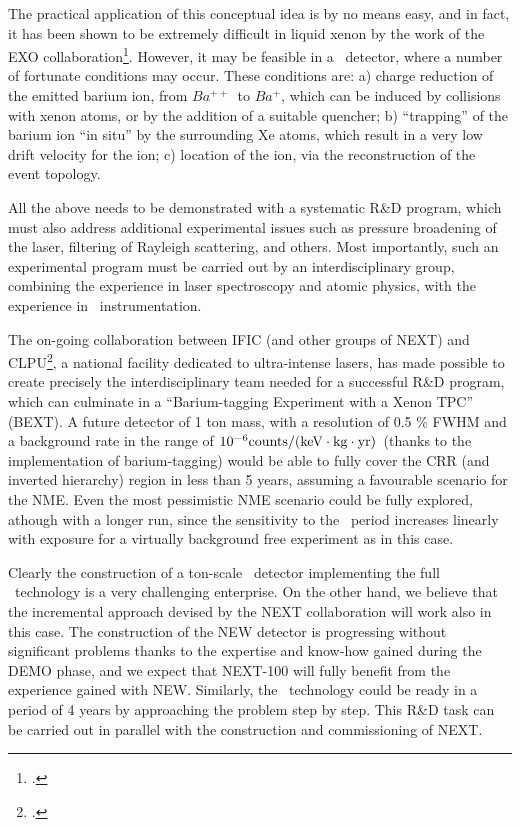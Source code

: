 The practical application of this conceptual idea is by no means easy, and in fact, it has been shown to be extremely difficult in liquid xenon by the work of the EXO collaboration\footcite{Dolinski:2012dta}. However, it may be feasible in a \HPXE\ detector, where a number of fortunate conditions may occur. These conditions are: a) charge reduction of the emitted barium ion, from $Ba^{++}$~to $Ba^{+}$, which can be induced by collisions with xenon atoms, or by the addition of a suitable quencher; b) ``trapping'' of the barium ion ``in situ'' by the surrounding Xe atoms, which result in a very low drift velocity for the ion; c) location of the ion, via the reconstruction of the event topology. 

All the above needs to be demonstrated with a systematic R\&D program, which must also address additional experimental issues such as pressure broadening of the laser, filtering of Rayleigh scattering, and others. Most importantly, such an experimental program must be carried out by an interdisciplinary group, combining the experience in laser spectroscopy and atomic physics, with the experience in \HPXE\ instrumentation.

The on-going collaboration between IFIC (and other groups of NEXT) and CLPU\footcite{clpu}, a national facility dedicated to ultra-intense lasers, has made possible to create precisely the interdisciplinary team needed for a successful R\&D program, which can culminate in a ``Barium-tagging Experiment with a Xenon TPC'' (BEXT). 
A future detector of 1 ton mass, with a resolution of 0.5 \% FWHM and a background rate in the range of $10^{-6} \rm counts/(keV \cdot kg \cdot yr)$~(thanks to the implementation of barium-tagging) would be able to fully cover the CRR (and inverted hierarchy) region in less than 5 years, assuming a favourable scenario for the NME. Even the most pessimistic NME scenario could be fully explored, athough with a longer run, since the sensitivity to the \bbonu\ period increases linearly with exposure for a virtually background free experiment as in this case. 

Clearly the construction of a ton-scale \HPXE\ detector implementing the full \BATA\ technology is a very challenging enterprise. On the other hand, we believe that the incremental approach devised by the NEXT collaboration will work also in this case. The construction of the NEW detector is progressing without significant problems thanks to the expertise and know-how gained during the DEMO phase, and we expect that NEXT-100 will fully benefit from the experience gained with NEW. Similarly, the \BATA\ technology could be ready in a period of 4 years by approaching the problem step by step. This R\&D task can be carried out in parallel with the construction and commissioning of NEXT.
